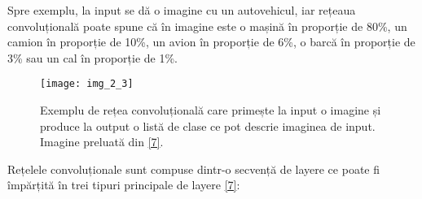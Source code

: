 Spre exemplu, la input se dă o imagine cu un autovehicul, iar rețeaua convoluțională poate spune că în imagine este o mașină în proporție de 80\%, un camion în proporție de 10\%, un avion în proporție de 6\%, o barcă în proporție de 3\% sau un cal în proporție de 1\%.

\begin{figure}[!h]
	\centering
	\texttt{[image: img\_2\_3]}
	\caption[Exemplu rețea convoluțională]{Exemplu de rețea convoluțională care primește la input o imagine și produce la output o listă de clase ce pot descrie imaginea de input. Imagine preluată din \hyperlink{datameetsmedia}{[7]}.}
\end{figure} 

Rețelele convoluționale sunt compuse dintr-o secvență de layere ce poate fi împărțită în trei tipuri principale de layere \hyperlink{cs231n}{[7]}:

